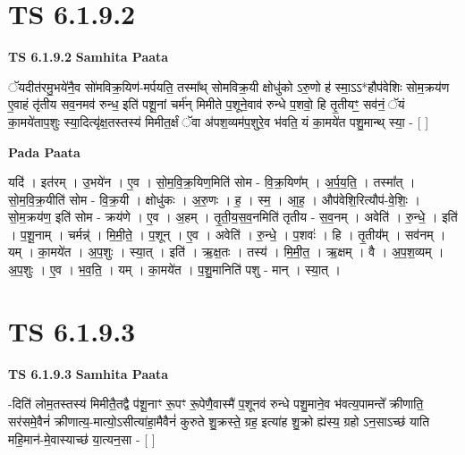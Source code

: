 \documentclass[17pt]{extarticle}
\begin{document}
\section*{ TS 6.1.9.2 }

\textbf{TS 6.1.9.2 } \newline
\textbf{Samhita Paata} \newline

ॅयदीत॑रमु॒भये॑नै॒व सो॑मविक्र॒यिण॑-मर्पयति॒ तस्मा᳚थ् सोमविक्र॒यी क्षोधु॑को ऽरु॒णो ह॑ स्मा॒ऽऽ*हौप॑वेशिः सोम॒क्रय॑ण ए॒वाहं तृ॑तीय सव॒नमव॑ रुन्ध॒ इति॑ पशू॒नां चर्म॑न् मिमीते प॒शूने॒वाव॑ रुन्धे प॒शवो॒ हि तृ॒तीयꣳ॒॒ सव॑नं॒ ॅयं का॒मये॑ताप॒शुः स्या॒दित्यृ॑क्ष॒तस्तस्य॑ मिमीत॒र्क्षं ॅवा अ॑पश॒व्यम॑प॒शुरे॒व भ॑वति॒ यं का॒मये॑त पशु॒मान्थ् स्या॒ - [  ] \newline

\textbf{Pada Paata} \newline

यदि॑ । इत॑रम् । उ॒भये॑न । ए॒व । सो॒म॒वि॒क्र॒यिण॒मिति॑ सोम - वि॒क्र॒यिण᳚म् । अ॒र्प॒य॒ति॒ । तस्मा᳚त् । सो॒म॒वि॒क्र॒यीति॑ सोम - वि॒क्र॒यी । क्षोधु॑कः । अ॒रु॒णः । ह॒ । स्म॒ । आ॒ह॒ । औप॑वेशि॒रित्यौप॑-वे॒शिः॒ । सो॒म॒क्रय॑ण॒ इति॑ सोम - क्रय॑णे । ए॒व । अ॒हम् । तृ॒ती॒य॒स॒व॒नमिति॑ तृतीय - स॒व॒नम् । अवेति॑ । रु॒न्धे॒ । इति॑ । प॒शू॒नाम् । चर्मन्न्॑ । मि॒मी॒ते॒ । प॒शून् । ए॒व । अवेति॑ । रु॒न्धे॒ । प॒शवः॑ । हि । तृ॒तीय᳚म् । सव॑नम् । यम् । का॒मये॑त । अ॒प॒शुः । स्या॒त् । इति॑ । ऋ॒क्ष॒तः । तस्य॑ । मि॒मी॒त॒ । ऋ॒क्षम् । वै । अ॒प॒श॒व्यम् । अ॒प॒शुः । ए॒व । भ॒व॒ति॒ । यम् । का॒मये॑त । प॒शु॒मानिति॑ पशु - मान् । स्या॒त् ।  \newline




\section*{ TS 6.1.9.3 }

\textbf{TS 6.1.9.3 } \newline
\textbf{Samhita Paata} \newline

-दिति॑ लोम॒तस्तस्य॑ मिमीतै॒तद्वै प॑शू॒नाꣳ रू॒पꣳ रू॒पेणै॒वास्मै॑ प॒शूनव॑ रुन्धे पशु॒माने॒व भ॑वत्य॒पामन्ते᳚ क्रीणाति॒ सर॑समे॒वैनं॑ क्रीणात्य॒-मात्यो॒ऽसीत्या॑हा॒मैवैनं॑ कुरुते शु॒क्रस्ते॒ ग्रह॒ इत्या॑ह शु॒क्रो ह्य॑स्य॒ ग्रहो ऽन॒साऽच्छ॑ याति महि॒मान॑-मे॒वास्याच्छ॑ या॒त्यन॒सा - [  ] \newline
\end{document}
